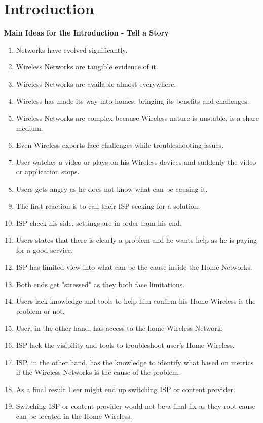 \section{Introduction}\label{Introduction}

\textbf{Main Ideas for the Introduction - Tell a Story}

\begin{enumerate}
	\item Networks have evolved significantly.
	\item Wireless Networks are tangible evidence of it.
	\item Wireless Networks are available almost everywhere.
	\item Wireless has made its way into homes, bringing its benefits and challenges.
	\item Wireless Networks are complex because Wireless nature is unstable, is a share medium.
	\item Even Wireless experts face challenges while troubleshooting issues.
	\item User watches a video or plays on his Wireless devices and suddenly the video or application stops.
	\item Users gets angry as he does not know what can be causing it.
	\item The first reaction is to call their ISP seeking for a solution.
	\item ISP check his side, settings are in order from his end.
	\item Users states that there is clearly a problem and he wants help as he is paying for a good service.
	\item ISP has limited view into what can be the cause inside the Home Networks.
	\item Both ends get "stressed" as they both face limitations.
	\item Users lack knowledge and tools to help him confirm his Home Wireless is the problem or not.
	\item User, in the other hand, has access to the home Wireless Network.
	\item ISP lack the visibility and tools to troubleshoot user's Home Wireless.
	\item ISP, in the other hand, has the knowledge to identify what based on metrics if the Wireless Networks is the cause of the problem.
	\item As a final result User might end up switching ISP or content provider.
	\item Switching ISP or content provider would not be a final fix as they root cause can be located in the Home Wireless.
\end{enumerate}


